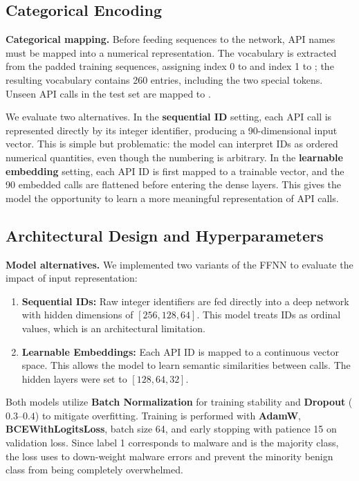 \subsection{Categorical Encoding}

\textbf{Categorical mapping.} Before feeding sequences to the network, API names must be mapped into a numerical representation. The vocabulary is extracted from the padded training sequences, assigning index 0 to  and index 1 to ; the resulting vocabulary contains 260 entries, including the two special tokens. Unseen API calls in the test set are mapped to .

We evaluate two alternatives. In the \textbf{sequential ID} setting, each API call is represented directly by its integer identifier, producing a 90-dimensional input vector. This is simple but problematic: the model can interpret IDs as ordered numerical quantities, even though the numbering is arbitrary. In the \textbf{learnable embedding} setting, each API ID is first mapped to a trainable vector, and the 90 embedded calls are flattened before entering the dense layers. This gives the model the opportunity to learn a more meaningful representation of API calls.

\subsection{Architectural Design and Hyperparameters}

\textbf{Model alternatives.} We implemented two variants of the FFNN to evaluate the impact of input representation:

\begin{enumerate}
    \item \textbf{Sequential IDs:} Raw integer identifiers are fed directly into a deep network with hidden dimensions of $[256, 128, 64]$. This model treats IDs as ordinal values, which is an architectural limitation.
    \item \textbf{Learnable Embeddings:} Each API ID is mapped to a continuous vector space. This allows the model to learn semantic similarities between calls. The hidden layers were set to $[128, 64, 32]$.
\end{enumerate}

Both models utilize \textbf{Batch Normalization} for training stability and \textbf{Dropout} ($0.3$--$0.4$) to mitigate overfitting. Training is performed with \textbf{AdamW}, \textbf{BCEWithLogitsLoss}, batch size 64, and early stopping with patience 15 on validation loss. Since label 1 corresponds to malware and is the majority class, the loss uses  to down-weight malware errors and prevent the minority benign class from being completely overwhelmed.

